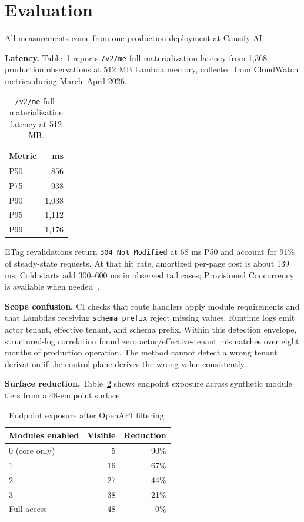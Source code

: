 \documentclass[10pt,journal]{IEEEtran}
\newcommand{\code}[1]{{\small\texttt{\textcolor{causifyblue}{#1}}}}
\begin{document}
\section{Evaluation}
\label{sec:eval}

All measurements come from one production deployment at Causify AI.

\textbf{Latency.} Table~\ref{tab:latency} reports \code{/v2/me} full-materialization latency from 1,368 production observations at 512 MB Lambda memory, collected from CloudWatch metrics during March--April 2026.

\begin{table}[h!]
  \centering
  \caption{\code{/v2/me} full-materialization latency at 512 MB.}
  \label{tab:latency}
  \small
  \begin{tabularx}{\columnwidth}{X r}
    \toprule
    \textbf{Metric} & \textbf{ms} \\
    \midrule
    P50 & 856 \\
    P75 & 938 \\
    P90 & 1,038 \\
    P95 & 1,112 \\
    P99 & 1,176 \\
    \bottomrule
  \end{tabularx}
\end{table}

ETag revalidations return \code{304 Not Modified} at 68 ms P50 and account for 91\% of steady-state requests. At that hit rate, amortized per-page cost is about 139 ms. Cold starts add 300--600 ms in observed tail cases; Provisioned Concurrency is available when needed~\cite{aws_lambda_docs}.

\textbf{Scope confusion.} CI checks that route handlers apply module requirements and that Lambdas receiving \code{schema\_prefix} reject missing values. Runtime logs emit actor tenant, effective tenant, and schema prefix. Within this detection envelope, structured-log correlation found zero actor/effective-tenant mismatches over eight months of production operation. The method cannot detect a wrong tenant derivation if the control plane derives the wrong value consistently.

\textbf{Surface reduction.} Table~\ref{tab:surface} shows endpoint exposure across synthetic module tiers from a 48-endpoint surface.

\begin{table}[h!]
  \centering
  \caption{Endpoint exposure after OpenAPI filtering.}
  \label{tab:surface}
  \small
  \begin{tabularx}{\columnwidth}{X r r}
    \toprule
    \textbf{Modules enabled} & \textbf{Visible} & \textbf{Reduction} \\
    \midrule
    0 (core only) & 5  & 90\% \\
    1             & 16 & 67\% \\
    2             & 27 & 44\% \\
    3+            & 38 & 21\% \\
    Full access   & 48 & 0\% \\
    \bottomrule
  \end{tabularx}
\end{table}
\end{document}
